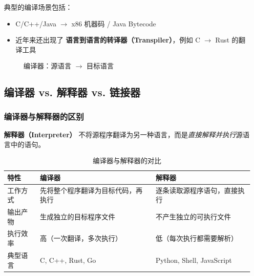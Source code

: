 \documentclass[12pt,a4paper]{ctexart}
\newcommand{\Compiler}{编译器\ }
\newcommand{\term}[1]{\textbf{\textcolor{mainblue}{#1}}}
\begin{document}
典型的编译场景包括：
\begin{itemize}[itemsep=0.2em]
  \item C/C++/Java $\rightarrow$ x86 机器码 / Java Bytecode
  \item 近年来还出现了 \textbf{语言到语言的转译器（Transpiler）}，例如 C $\rightarrow$ Rust 的翻译工具
\end{itemize}

\begin{figure}[h]
\centering
{}
\caption{编译器：源语言 $\rightarrow$ 目标语言}
\end{figure}

\subsection{编译器 vs. 解释器 vs. 链接器}

\subsubsection{编译器与解释器的区别}

\begin{keybox}
  \term{解释器（Interpreter）} 不将源程序翻译为另一种语言，而是\emph{直接解释并执行}源语言中的语句。
\end{keybox}

\begin{table}[h]
\centering
\begin{tabularx}{\textwidth}{@{}lXX@{}}
\toprule
\textbf{特性} & \textbf{编译器} & \textbf{解释器} \\
\midrule
工作方式 & 先将整个程序翻译为目标代码，再执行 & 逐条读取源程序语句，直接执行 \\
输出产物 & 生成独立的目标程序文件 & 不产生独立的可执行文件 \\
执行效率 & 高（一次翻译，多次执行） & 低（每次执行都需要解析） \\
典型语言 & C, C++, Rust, Go & Python, Shell, JavaScript \\
\bottomrule
\end{tabularx}
\caption{编译器与解释器的对比}
\end{table}
\end{document}

